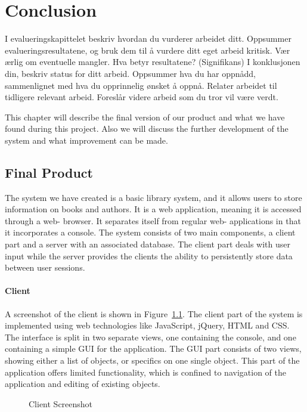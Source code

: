 \chapter{Conclusion}

\minitoc

I evalueringskapittelet beskriv hvordan du vurderer
arbeidet ditt. Oppsummer evalueringsresultatene, og
bruk dem til å vurdere ditt eget arbeid kritisk. Vær
ærlig om eventuelle mangler.
Hva betyr resultatene? (Signifikans)
I konklusjonen din, beskriv status for ditt arbeid.
Oppsummer hva du har oppnådd, sammenlignet
med hva du opprinnelig ønsket å oppnå. Relater
arbeidet til tidligere relevant arbeid. Foreslår videre
arbeid som du tror vil være verdt.

This chapter will describe the final version of our product and what we have found during this project. Also we will discuss the further development of the system and what improvement can be made.

\clearpage

\section{Final Product}
The system we have created is a basic library system, and it allows users to store information on books and authors. It is a web application, meaning it is accessed through a web- browser. It separates itself from regular web- applications in that it incorporates a console. The system consists of two main components, a client part and a server with an associated database. The client part deals with user input while the server provides the clients the ability to persistently store data between user sessions.

\subsubsection{Client}
A screenshot of the client is shown in Figure~\ref{figure:wonsoleScreenshot}. The client part of the system is implemented using web technologies like JavaScript, jQuery, HTML and CSS. The interface is split in two separate views, one containing the console, and one containing a simple GUI for the application. The GUI part consists of two views, showing either a list of objects, or specifics on one single object. This part of the application offers limited functionality, which is confined to navigation of the application and editing of existing objects.

\begin{figure}[H]
\centering
\caption{Client Screenshot}
\label{figure:wonsoleScreenshot}
\end{figure}


